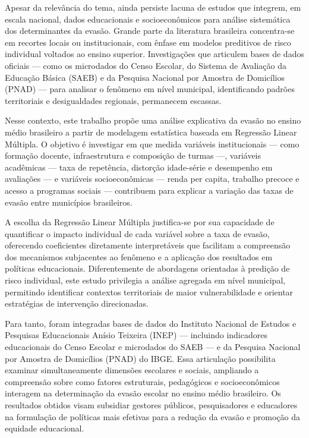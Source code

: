 \documentclass[english, spanish, brazilian]{RBIEarticle} %
\begin{document}
Apesar da relevância do tema, ainda persiste lacuna de estudos que integrem, em escala nacional, dados educacionais e socioeconômicos para análise sistemática dos determinantes da evasão. Grande parte da literatura brasileira concentra-se em recortes locais ou institucionais, com ênfase em modelos preditivos de risco individual voltados ao ensino superior. Investigações que articulem bases de dados oficiais — como os microdados do Censo Escolar, do Sistema de Avaliação da Educação Básica (SAEB) e da Pesquisa Nacional por Amostra de Domicílios (PNAD) — para analisar o fenômeno em nível municipal, identificando padrões territoriais e desigualdades regionais, permanecem escassas.

Nesse contexto, este trabalho propõe uma análise explicativa da evasão no ensino médio brasileiro a partir de modelagem estatística baseada em Regressão Linear Múltipla. O objetivo é investigar em que medida variáveis institucionais — como formação docente, infraestrutura e composição de turmas —, variáveis acadêmicas — taxa de repetência, distorção idade-série e desempenho em avaliações — e variáveis socioeconômicas — renda per capita, trabalho precoce e acesso a programas sociais — contribuem para explicar a variação das taxas de evasão entre municípios brasileiros.

A escolha da Regressão Linear Múltipla justifica-se por sua capacidade de quantificar o impacto individual de cada variável sobre a taxa de evasão, oferecendo coeficientes diretamente interpretáveis que facilitam a compreensão dos mecanismos subjacentes ao fenômeno e a aplicação dos resultados em políticas educacionais. Diferentemente de abordagens orientadas à predição de risco individual, este estudo privilegia a análise agregada em nível municipal, permitindo identificar contextos territoriais de maior vulnerabilidade e orientar estratégias de intervenção direcionadas.

Para tanto, foram integradas bases de dados do Instituto Nacional de Estudos e Pesquisas Educacionais Anísio Teixeira (INEP) — incluindo indicadores educacionais do Censo Escolar e microdados do SAEB — e da Pesquisa Nacional por Amostra de Domicílios (PNAD) do IBGE. Essa articulação possibilita examinar simultaneamente dimensões escolares e sociais, ampliando a compreensão sobre como fatores estruturais, pedagógicos e socioeconômicos interagem na determinação da evasão escolar no ensino médio brasileiro. Os resultados obtidos visam subsidiar gestores públicos, pesquisadores e educadores na formulação de políticas mais efetivas para a redução da evasão e promoção da equidade educacional.
\end{document}
